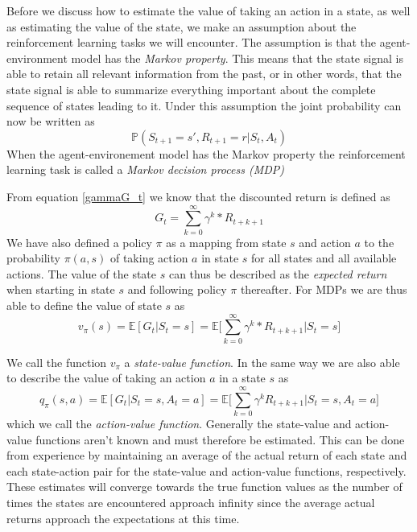 \documentclass[11pt]{article}
\begin{document}
Before we discuss how to estimate the value of taking an action in a state, as
well as estimating the value of the state, we make an assumption about the reinforcement
learning tasks we will encounter.
The assumption is that the agent-environment model has the \textit{Markov property}.
This means that the state signal is able to retain all relevant information
from the past, or in other words, that the state signal is able to summarize
everything important about the complete sequence of states leading to it.
Under this assumption the joint probability can now be written as
\begin{equation}
    \mathds{P}(S_{t+1} = s', R_{t+1} = r | S_t, A_t)
\end{equation}
When the agent-environement model has the Markov property the reinforcement
learning task is called a \textit{Markov decision process (MDP)}

From equation \ref{gammaG_t} we know that the discounted return
is defined as 
\begin{equation}
    G_t = \sum\limits_{k=0}^\infty \gamma^k * R_{t+k+1}
\end{equation}
We have also defined a policy $\pi$ as a mapping from state $s$ and action $a$
to the probability $\pi(a, s)$ of taking action $a$ in state $s$ for all states
and all available actions.
The value of the state $s$ can thus be described as the \textit{expected return}
when starting in state $s$ and following policy $\pi$ thereafter\cite{RLBook}.
For MDPs we are thus able to define the value of state $s$ as
\begin{equation}
    v_\pi(s) = \mathds{E}[G_t | S_t = s] = \mathds{E}\big[\sum\limits_{k=0}^\infty \gamma^k * R_{t+k+1} \big| S_t = s\big]
\end{equation}

We call the function $v_\pi$ a \textit{state-value function}.
In the same way we are also able to describe the value of taking an action $a$ in a state $s$  as
\begin{equation}
    q_{\pi}(s, a) = \mathds{E}[G_{t} | S_{t} = s, A_{t} = a] = \mathds{E}\bigg[\sum_{k = 0}^{\infty} \gamma^{k} R_{t + k + 1} \bigg| S_{t} = s, A_{t} = a \bigg]
\end{equation}
which we call the \textit{action-value function}.
Generally the state-value and action-value functions aren't known and must therefore be
estimated.
This can be done from experience by maintaining an average of the actual return of each
state and each state-action pair for the state-value and action-value
functions, respectively.
These estimates will converge towards the true function values as the number of times
the states are encountered approach infinity since the average actual returns approach
the expectations at this time.
\end{document}
